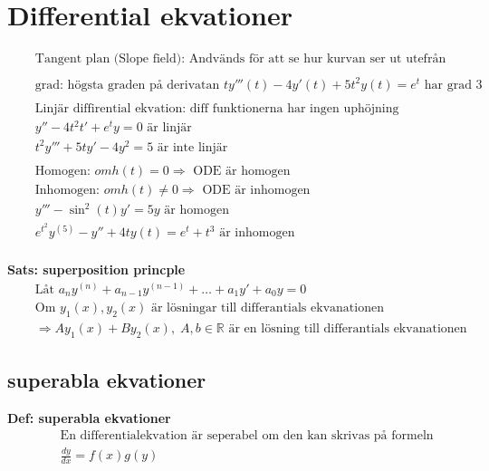 \documentclass{article}
\begin{document}
\newpage


\section{Differential ekvationer}
 
\begin{align*}
  &\quad  \text{Tangent plan (Slope field):
    Andvänds för att se hur kurvan ser ut utefrån olika start värden.} \\
  &\quad  \\
  &\quad  \text{grad: högsta graden på derivatan }  t y'''(t) - 4y'(t) + 5t^2y(t) = e^t
  \text{ har grad 3} \\
  &\quad  \\
  &\quad  \text{Linjär diffirential ekvation: diff funktionerna har ingen uphöjning } \\
  &\quad  y'' - 4t^2t' + e^t y = 0 \text{ är linjär} \\
  &\quad  t^2 y''' + 5ty' - 4y^2 = 5 \text{ är inte linjär} \\
  &\quad  \\
  &\quad  \text{Homogen: } om h(t)=0 \Rightarrow \text{ ODE är homogen} \\
  &\quad  \text{Inhomogen: } om h(t)\neq0 \Rightarrow \text{ ODE är inhomogen} \\
  &\quad  y''' - \sin^2(t)y' = 5y \text{ är homogen} \\
  &\quad  e^{t^2} y^{(5)} - y'' + 4ty(t) = e^t + t^3 \text{ är inhomogen} \\
\end{align*}


\textbf{Sats: superposition princple}
\begin{align*}
  &\quad  \text{Låt } a_{n}y^{(n)} + a_{n-1}y^{(n-1)} + \ldots + a_{1}y' + a_{0}y = 0  \\
  &\quad  \text{Om } y_1(x), y_2(x) \text{ är lösningar till differantials ekvanationen} \\
  &\quad  \Rightarrow Ay_1(x) + By_2(x), \; A,b \in \mathbb{R}
  \text{ är en lösning till differantials ekvanationen}
\end{align*}


\newpage


\subsection{superabla ekvationer}
\textbf{Def: superabla ekvationer}
\begin{align*}
  &\quad  \text{En differentialekvation är seperabel om den kan skrivas på formeln} \\
  &\quad  \frac{dy}{dx} = f(x)g(y)
\end{align*}
\end{document}
